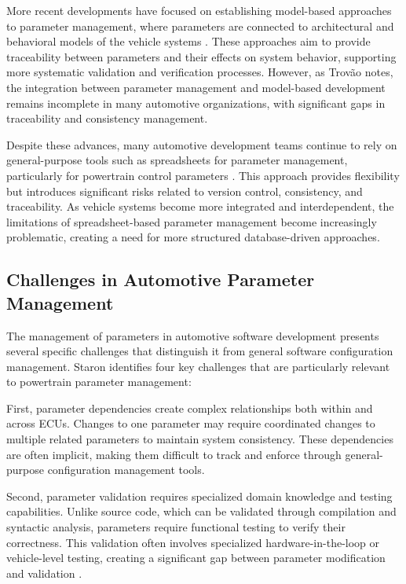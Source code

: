 More recent developments have focused on establishing model-based approaches to parameter management, where parameters are connected to architectural and behavioral models of the vehicle systems \cite{staron2021automotive}. These approaches aim to provide traceability between parameters and their effects on system behavior, supporting more systematic validation and verification processes. However, as Trovão \cite{trovao2024evolution} notes, the integration between parameter management and model-based development remains incomplete in many automotive organizations, with significant gaps in traceability and consistency management.

Despite these advances, many automotive development teams continue to rely on general-purpose tools such as spreadsheets for parameter management, particularly for powertrain control parameters \cite{broy2006challenges}. This approach provides flexibility but introduces significant risks related to version control, consistency, and traceability. As vehicle systems become more integrated and interdependent, the limitations of spreadsheet-based parameter management become increasingly problematic, creating a need for more structured database-driven approaches.

\subsection{Challenges in Automotive Parameter Management}
\label{subsec:challenges-parameter-management}

The management of parameters in automotive software development presents several specific challenges that distinguish it from general software configuration management. Staron \cite{staron2021automotive} identifies four key challenges that are particularly relevant to powertrain parameter management:

First, parameter dependencies create complex relationships both within and across ECUs. Changes to one parameter may require coordinated changes to multiple related parameters to maintain system consistency. These dependencies are often implicit, making them difficult to track and enforce through general-purpose configuration management tools.

Second, parameter validation requires specialized domain knowledge and testing capabilities. Unlike source code, which can be validated through compilation and syntactic analysis, parameters require functional testing to verify their correctness. This validation often involves specialized hardware-in-the-loop or vehicle-level testing, creating a significant gap between parameter modification and validation \cite{pretschner2007software}.

